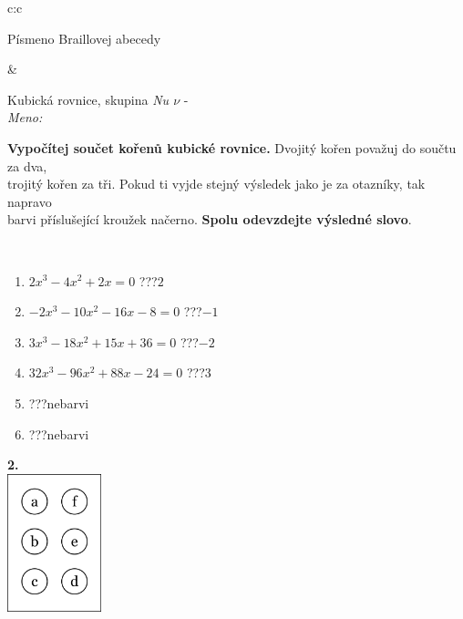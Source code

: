 \documentclass[10pt]{report}
\begin{document}
\begin{tabular}{c:c}
\begin{minipage}[c][104.5mm][t]{0.5\linewidth}
\begin{center}
\begin{minipage}{0.20\linewidth}
\begin{center}
{\small Písmeno Braillovej abecedy}
\end{center}
\end{minipage}
\end{center}
\end{minipage}
&
\begin{minipage}[c][104.5mm][t]{0.5\linewidth}
\begin{center}
\vspace{7mm}
{\huge Kubická rovnice, skupina \textit{Nu $\nu$} -}\\[5mm]
\textit{Meno:}\phantom{xxxxxxxxxxxxxxxxxxxxxxxxxxxxxxxxxxxxxxxxxxxxxxxxxxxxxxxxxxxxxxxxx}\\[5mm]
\begin{minipage}{0.95\linewidth}
\textbf{Vypočítej součet kořenů kubické rovnice.} Dvojitý kořen považuj do součtu za dva,\\trojitý kořen za tři. Pokud ti vyjde stejný výsledek jako je za otazníky, tak napravo\\barvi příslušející kroužek načerno. \textbf{Spolu odevzdejte výsledné slovo}.
\end{minipage}
\\[1mm]
\begin{minipage}{0.79\linewidth}
\begin{center}
\begin{varwidth}{\linewidth}
\begin{enumerate}
\Large
\item $2x^3-4x^2+2x=0$\quad \dotfill\; ???\;\dotfill \quad $2$
\item $-2x^3-10x^2-16x-8=0$\quad \dotfill\; ???\;\dotfill \quad $-1$
\item $3x^3-18x^2+15x+36=0$\quad \dotfill\; ???\;\dotfill \quad $-2$
\item $32x^3-96x^2+88x-24=0$\quad \dotfill\; ???\;\dotfill \quad $3$
\item \quad \dotfill\; ???\;\dotfill \quad nebarvi
\item \quad \dotfill\; ???\;\dotfill \quad nebarvi
\end{enumerate}
\end{varwidth}
\end{center}
\end{minipage}
\begin{minipage}{0.20\linewidth}
\begin{center}
{\Huge\bfseries 2.} \\[2mm]
\includegraphics[height=40mm]{../images/braille.png}

\end{center}
\end{minipage}
\end{center}
\end{minipage}
\end{tabular}
\end{document}
